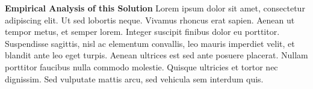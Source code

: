 \textbf{Empirical Analysis of this Solution}
Lorem ipsum dolor sit amet, consectetur adipiscing elit. Ut sed lobortis neque. Vivamus rhoncus erat sapien. Aenean ut tempor metus, et semper lorem. Integer suscipit finibus dolor eu porttitor. Suspendisse sagittis, nisl ac elementum convallis, leo mauris imperdiet velit, et blandit ante leo eget turpis. Aenean ultrices est sed ante posuere placerat. Nullam porttitor faucibus nulla commodo molestie. Quisque ultricies et tortor nec dignissim. Sed vulputate mattis arcu, sed vehicula sem interdum quis.





